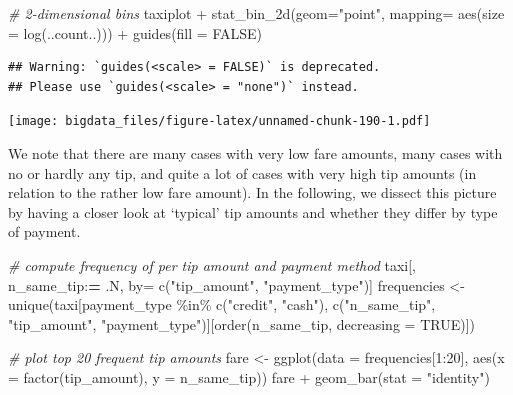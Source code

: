 \documentclass[
  12pt,
]{style/krantz}
\newenvironment{Shaded}{\begin{snugshade}}{\end{snugshade}}
\newcommand{\AttributeTok}[1]{\textcolor[rgb]{0.77,0.63,0.00}{#1}}
\newcommand{\CommentTok}[1]{\textcolor[rgb]{0.56,0.35,0.01}{\textit{#1}}}
\newcommand{\ConstantTok}[1]{\textcolor[rgb]{0.00,0.00,0.00}{#1}}
\newcommand{\DecValTok}[1]{\textcolor[rgb]{0.00,0.00,0.81}{#1}}
\newcommand{\ErrorTok}[1]{\textcolor[rgb]{0.64,0.00,0.00}{\textbf{#1}}}
\newcommand{\FunctionTok}[1]{\textcolor[rgb]{0.00,0.00,0.00}{#1}}
\newcommand{\NormalTok}[1]{#1}
\newcommand{\OtherTok}[1]{\textcolor[rgb]{0.56,0.35,0.01}{#1}}
\newcommand{\SpecialCharTok}[1]{\textcolor[rgb]{0.00,0.00,0.00}{#1}}
\newcommand{\StringTok}[1]{\textcolor[rgb]{0.31,0.60,0.02}{#1}}
\begin{document}
\begin{Shaded}
\begin{Highlighting}[]
\CommentTok{\# 2{-}dimensional bins}
\NormalTok{taxiplot }\SpecialCharTok{+}
     \FunctionTok{stat\_bin\_2d}\NormalTok{(}\AttributeTok{geom=}\StringTok{"point"}\NormalTok{,}
                 \AttributeTok{mapping=} \FunctionTok{aes}\NormalTok{(}\AttributeTok{size =} \FunctionTok{log}\NormalTok{(..count..))) }\SpecialCharTok{+}
     \FunctionTok{guides}\NormalTok{(}\AttributeTok{fill =} \ConstantTok{FALSE}\NormalTok{)}
\end{Highlighting}
\end{Shaded}

\begin{verbatim}
## Warning: `guides(<scale> = FALSE)` is deprecated.
## Please use `guides(<scale> = "none")` instead.
\end{verbatim}

\texttt{[image: bigdata\_files/figure-latex/unnamed-chunk-190-1.pdf]}

We note that there are many cases with very low fare amounts, many cases with no or hardly any tip, and quite a lot of cases with very high tip amounts (in relation to the rather low fare amount). In the following, we dissect this picture by having a closer look at `typical' tip amounts and whether they differ by type of payment.

\begin{Shaded}
\begin{Highlighting}[]
\CommentTok{\# compute frequency of per tip amount and payment method}
\NormalTok{taxi[, n\_same\_tip}\SpecialCharTok{:}\ErrorTok{=}\NormalTok{ .N, by}\OtherTok{=} \FunctionTok{c}\NormalTok{(}\StringTok{"tip\_amount"}\NormalTok{, }\StringTok{"payment\_type"}\NormalTok{)]}
\NormalTok{frequencies }\OtherTok{\textless{}{-}} \FunctionTok{unique}\NormalTok{(taxi[payment\_type }\SpecialCharTok{\%in\%} \FunctionTok{c}\NormalTok{(}\StringTok{"credit"}\NormalTok{, }\StringTok{"cash"}\NormalTok{),}
                           \FunctionTok{c}\NormalTok{(}\StringTok{"n\_same\_tip"}\NormalTok{, }\StringTok{"tip\_amount"}\NormalTok{, }\StringTok{"payment\_type"}\NormalTok{)][}\FunctionTok{order}\NormalTok{(n\_same\_tip, }\AttributeTok{decreasing =} \ConstantTok{TRUE}\NormalTok{)])}


\CommentTok{\# plot top 20 frequent tip amounts}
\NormalTok{fare }\OtherTok{\textless{}{-}} \FunctionTok{ggplot}\NormalTok{(}\AttributeTok{data =}\NormalTok{ frequencies[}\DecValTok{1}\SpecialCharTok{:}\DecValTok{20}\NormalTok{], }\FunctionTok{aes}\NormalTok{(}\AttributeTok{x =} \FunctionTok{factor}\NormalTok{(tip\_amount), }\AttributeTok{y =}\NormalTok{ n\_same\_tip)) }
\NormalTok{fare }\SpecialCharTok{+} \FunctionTok{geom\_bar}\NormalTok{(}\AttributeTok{stat =} \StringTok{"identity"}\NormalTok{) }
\end{Highlighting}
\end{Shaded}
\end{document}
